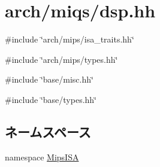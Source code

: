 \hypertarget{miqs_2dsp_8hh}{
\section{arch/miqs/dsp.hh}
\label{miqs_2dsp_8hh}
}
{\ttfamily \#include \char`\"{}arch/mips/isa\_\-traits.hh\char`\"{}}\par
{\ttfamily \#include \char`\"{}arch/mips/types.hh\char`\"{}}\par
{\ttfamily \#include \char`\"{}base/misc.hh\char`\"{}}\par
{\ttfamily \#include \char`\"{}base/types.hh\char`\"{}}\par
\subsection*{ネームスペース}
\begin{DoxyCompactItemize}
\item 
namespace \hyperlink{namespaceMipsISA}{MipsISA}
\end{DoxyCompactItemize}
